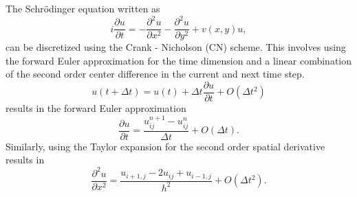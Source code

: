 \documentclass[english,notitlepage,reprint,nofootinbib]{revtex4-1}  %
\begin{document}
The Schrödinger equation written as
\begin{equation}
    i \frac{\partial u}{\partial t} = - \frac{\partial^2 u}{\partial x^2} - \frac{\partial^2 u}{\partial y^2} + v(x,y)u, \label{eq:wave_eq_appendix}
\end{equation}
can be discretized using the Crank - Nicholson (CN) scheme. This involves using the forward Euler approximation for the time dimension and a linear combination of the second order center difference in the current and next time step.
\begin{equation}
    u(t + \Delta t ) = u(t) + \Delta t \frac{\partial u}{\partial t} + O(\Delta t^2)
\end{equation}
results in the forward Euler approximation
\begin{equation}
    \frac{\partial u}{\partial t} = \frac{u_{ij}^{n+1} - u_{ij}^n}{\Delta t} + O(\Delta t). \label{eq:partial_t}
\end{equation}
Similarly, using the Taylor expansion for the second order spatial derivative results in
\begin{equation}
    \frac{\partial^2 u}{\partial x^2} = \frac{u_{i+1,j} -2u_{ij} + u_{i-1,j}}{h^2} + O(\Delta t^2).
\end{equation}
\end{document}
